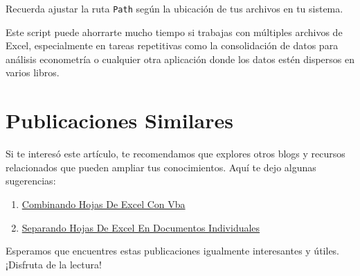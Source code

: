 \documentclass[
  jou,
  floatsintext,
  longtable,
  a4paper,
  nolmodern,
  notxfonts,
  notimes,
  12pt,
  colorlinks=true,linkcolor=blue,citecolor=blue,urlcolor=blue]{apa7}
\providecommand{\tightlist}{%
  \setlength{\itemsep}{0pt}\setlength{\parskip}{0pt}}
\begin{document}
Recuerda ajustar la ruta \texttt{Path} según la ubicación de tus
archivos en tu sistema.

Este script puede ahorrarte mucho tiempo si trabajas con múltiples
archivos de Excel, especialmente en tareas repetitivas como la
consolidación de datos para análisis econometría o cualquier otra
aplicación donde los datos estén dispersos en varios libros.

\section{Publicaciones Similares}\label{publicaciones-similares}

Si te interesó este artículo, te recomendamos que explores otros blogs y
recursos relacionados que pueden ampliar tus conocimientos. Aquí te dejo
algunas sugerencias:

\begin{enumerate}
\def\labelenumi{\arabic{enumi}.}
\tightlist
\item
  \href{https://numerus-scriptum.netlify.app/ofimatica/2023-05-31-combinando-hojas-de-excel-con-vba/index.pdf}{}
  \href{https://numerus-scriptum.netlify.app/ofimatica/2023-05-31-combinando-hojas-de-excel-con-vba}{Combinando
  Hojas De Excel Con Vba}
\item
  \href{https://numerus-scriptum.netlify.app/ofimatica/2023-06-05-separando-hojas-de-excel-en-documentos-individuales/index.pdf}{}
  \href{https://numerus-scriptum.netlify.app/ofimatica/2023-06-05-separando-hojas-de-excel-en-documentos-individuales}{Separando
  Hojas De Excel En Documentos Individuales}
\end{enumerate}

Esperamos que encuentres estas publicaciones igualmente interesantes y
útiles. ¡Disfruta de la lectura!
\end{document}
